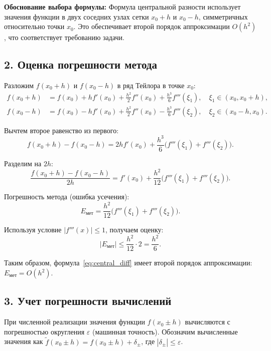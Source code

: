 \documentclass{article}
\begin{document}
\textbf{Обоснование выбора формулы:} Формула центральной разности использует значения функции в двух соседних узлах сетки $x_0 + h$ и $x_0 - h$, симметричных относительно точки $x_0$. Это обеспечивает второй порядок аппроксимации $O(h^2)$, что соответствует требованию задачи.

\subsection*{2. Оценка погрешности метода}

Разложим $f(x_0 + h)$ и $f(x_0 - h)$ в ряд Тейлора в точке $x_0$:
\begin{align}
f(x_0 + h) &= f(x_0) + h f'(x_0) + \frac{h^2}{2} f''(x_0) + \frac{h^3}{6} f'''(\xi_1), \quad \xi_1 \in (x_0, x_0 + h), \\
f(x_0 - h) &= f(x_0) - h f'(x_0) + \frac{h^2}{2} f''(x_0) - \frac{h^3}{6} f'''(\xi_2), \quad \xi_2 \in (x_0 - h, x_0).
\end{align}

Вычтем второе равенство из первого:
\begin{equation}
f(x_0 + h) - f(x_0 - h) = 2h f'(x_0) + \frac{h^3}{6} \bigl(f'''(\xi_1) + f'''(\xi_2)\bigr).
\end{equation}

Разделим на $2h$:
\begin{equation}
\frac{f(x_0 + h) - f(x_0 - h)}{2h} = f'(x_0) + \frac{h^2}{12} \bigl(f'''(\xi_1) + f'''(\xi_2)\bigr).
\end{equation}

Погрешность метода (ошибка усечения):
\begin{equation}
E_{\text{мет}} = \frac{h^2}{12} \bigl(f'''(\xi_1) + f'''(\xi_2)\bigr).
\end{equation}

Используя условие $|f'''(x)| \leq 1$, получаем оценку:
\begin{equation}
|E_{\text{мет}}| \leq \frac{h^2}{12} \cdot 2 = \frac{h^2}{6}.
\label{eq:method_error}
\end{equation}

Таким образом, формула~\eqref{eq:central_diff} имеет второй порядок аппроксимации: $E_{\text{мет}} = O(h^2)$.

\subsection*{3. Учет погрешности вычислений}

При численной реализации значения функции $f(x_0 \pm h)$ вычисляются с погрешностью округления $\varepsilon$ (машинная точность). Обозначим вычисленные значения как $\tilde{f}(x_0 \pm h) = f(x_0 \pm h) + \delta_{\pm}$, где $|\delta_{\pm}| \leq \varepsilon$.
\end{document}
